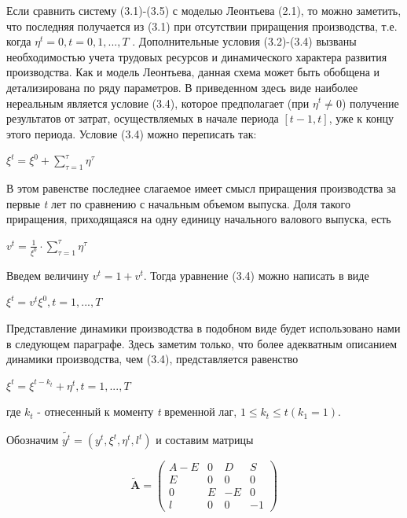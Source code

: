\documentclass[12pt, 4paper]{book}
\begin{document}
{Если сравнить систему (3.1)-(3.5) с моделью Леонтьева (2.1), то можно заметить, что последняя получается из (3.1) при отсутствии приращения производства, т.е. когда $\eta^t=0,t=0,1,...,T$ . Дополнительные условия (3.2)-(3.4) вызваны необходимостью учета трудовых ресурсов и динамического характера развития производства. Как и модель Леонтьева, данная схема может быть обобщена и детализирована по ряду параметров. В приведенном здесь виде наиболее нереальным является условие (3.4), которое предполагает (при $\eta^t \neq 0$) получение результатов от затрат, осуществляемых в начале периода $[t-1,t]$, уже к концу этого периода. Условие (3.4) можно переписать так:
\begin{center}
$\xi^t = \xi^0+ \sum\limits_{\tau =1}^{\tau}\eta^{\tau}$
\end{center}
\par

В этом равенстве последнее слагаемое имеет смысл приращения производства за первые \textit{t} лет по сравнению с начальным объемом выпуска. Доля такого приращения, приходящаяся на одну единицу начального валового выпуска, есть
\begin{center}
$v^t=\frac{1}{\xi^0} \cdot \sum\limits_{\tau = 1}^{\tau}\eta^{\tau}$
\end{center}
\par

Введем величину $v^t=1+v^t$. Тогда уравнение (3.4) можно написать в виде
\begin{center}
$\xi^t = v^t \xi^0, t=1,...,T$
\end{center}
\par

Представление динамики производства в подобном виде будет использовано нами в следующем параграфе. Здесь заметим только, что более адекватным описанием динамики производства, чем (3.4), представляется равенство
\begin{center}
$\xi^t=\xi^{t-k_t}+\eta^t,t=1,...,T$
\end{center}
где $k_t$ - отнесенный к моменту \textit{t} временной лаг, $1 \leq k_t \leq t (k_1 = 1).$
\par

Обозначим $\tilde{y^t}=(y^t,\xi^t,\eta^t,l^t)$ и составим матрицы
\begin{center}
\begin{displaymath}
\mathbf{\tilde{A}} =
\left( \begin{array}{cccc}
A-E & 0 & D & S \\
E & 0 & 0 & 0 \\
0 & E & -E & 0\\
l & 0 & 0 & -1
\end{array} \right)
\end{displaymath}
\end{center}

}
\end{document}
